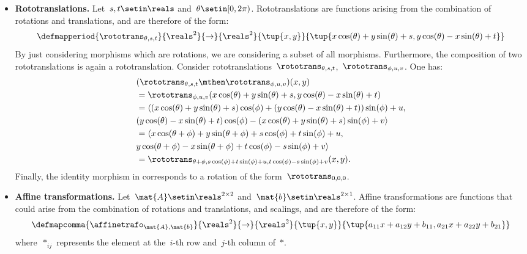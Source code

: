 \begin{solution}
\begin{itemize}
        \item \textbf{Rototranslations.}
              Let~$s,t\setin \reals$ and~$\theta \setin [0,2\pi)$.
              Rototranslations are functions arising from the combination of rotations and translations, and are therefore of the form:
              \begin{equation*}
                  \defmapperiod{\rototrans_{\theta,s,t}}{\reals^2}{\to}{\reals^2}{\tup{x,y}}{\tup{x\cos(\theta)+y\sin(\theta)+s, y\cos(\theta)-x\sin(\theta)+t}}
              \end{equation*}
              By just considering morphisms which are rotations, we are considering a subset of all morphisms.
              Furthermore, the composition of two rototranslations is again a rototranslation.
              Consider rototranslations~$\rototrans_{\theta,s,t}$,~$\rototrans_{\phi,u,v}$.
              One has:
              \begin{equation*}
                  \begin{aligned}
                       & (\rototrans_{\theta,s,t}\mthen \rototrans_{\phi,u,v})(x,y) \\
                       & =\rototrans_{\phi,u,v}(x\cos(\theta)+y\sin(\theta)+s, y\cos(\theta)-x\sin(\theta)+t) \\
                       & =\langle(x\cos(\theta)+y\sin(\theta)+s)\cos(\phi)+(y\cos(\theta)-x\sin(\theta)+t))\sin(\phi)+u, \\
                       & (y\cos(\theta)-x\sin(\theta)+t)\cos(\phi) - (x\cos(\theta)+y\sin(\theta)+s)\sin(\phi)+v\rangle \\
                       & =\langle x\cos(\theta+\phi)+y\sin(\theta+\phi)+s\cos(\phi)+t\sin(\phi)+u, \\
                       & y\cos(\theta+\phi)-x\sin(\theta+\phi)+t\cos(\phi)-s\sin(\phi)+v\rangle \\
                       & =\rototrans_{\theta+\phi,s\cos(\phi)+t\sin(\phi)+u, t\cos(\phi)-s\sin(\phi)+v}(x,y).
                  \end{aligned}
              \end{equation*}
              Finally, the identity morphism in \Draw corresponds to a rotation of the form~$\rototrans_{0,0,0}$.
        \item \textbf{Affine transformations.}
              Let~$\mat{A}\setin \reals^{2\times 2}$ and~$\mat{b}\setin \reals^{2\times 1}$.
              Affine transformations are functions that could arise from the combination of rotations and translations, and scalings, and are therefore of the form:
              \begin{equation*}
                  \defmapcomma{\affinetrafo_{\mat{A},\mat{b}}}{\reals^2}{\to}{\reals^2}{\tup{x,y}}{\tup{a_{11}x+a_{12}y+b_{11},a_{21}x+a_{22}y+b_{21}}}
              \end{equation*}
              where~$*_{ij}$ represents the element at the~$i$-th row and~$j$-th column of~$*$.


\end{itemize}
\end{solution}
